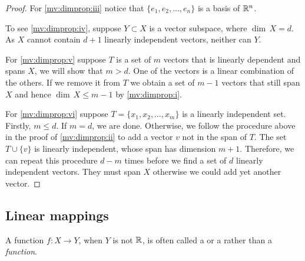 \begin{proof}
For \ref{mv:dimprop:iii} notice that $\{ e_1, e_2, \ldots, e_n \}$ is a basis of ${\mathbb{R}}^n$.

To see \ref{mv:dimprop:iv},
suppose $Y \subset X$ is a vector subspace,
where $\dim \, X = d$.  As $X$ cannot contain $d+1$ linearly independent
vectors, neither can $Y$.

For \ref{mv:dimprop:v} suppose $T$ is a set of $m$ vectors
that is linearly dependent
and spans $X$, we will show that $m > d$.  One of the
vectors is a linear combination of the others.  If we remove it
from $T$ we obtain a set of $m-1$ vectors that still span $X$ and hence
$\dim \, X \leq m-1$ by \ref{mv:dimprop:i}.

For \ref{mv:dimprop:vi} suppose $T = \{ x_1, x_2, \ldots, x_m \}$ is
a linearly independent set.  Firstly, $m \leq d$.
If $m=d$, we are done.  Otherwise,
we follow the procedure above in the proof of
\ref{mv:dimprop:ii}
to add a vector $v$ not in the span of $T$.  The set
$T \cup \{ v \}$
is linearly independent, whose span has dimension $m+1$.
Therefore, we can repeat this procedure $d-m$ times before
we find a set of $d$ linearly independent vectors.
They must span $X$ otherwise we could add yet another vector.
\end{proof}

\subsection{Linear mappings}

A function $f \colon X \to Y$, when $Y$ is not ${\mathbb{R}}$, is often called a
\emph{} or a \emph{}
rather than a \emph{function}.

